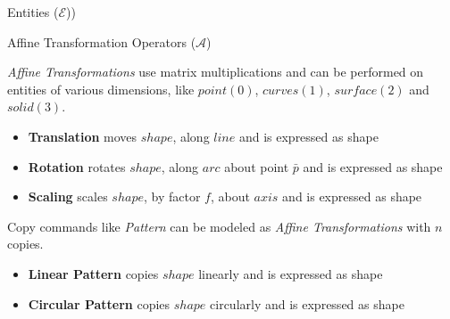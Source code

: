 \begin{frame}{Entities ($\mathcal{E}$))}
\begin{itemize}[noitemsep,label=\textbullet,topsep=2pt,parsep=2pt,partopsep=2pt]
%

%

\end{itemize}
\end{frame}
\begin{frame}{Affine Transformation Operators ($\mathcal{A}$)}

{\em Affine Transformations} use matrix multiplications and can be performed on entities of various dimensions, like $point (0)$, $curves(1)$, $surface(2)$ and $solid(3)$. 

\begin{itemize}[noitemsep,label=\textbullet,topsep=2pt,parsep=2pt,partopsep=2pt]
\item {\bf Translation} moves $shape$, along $line$ and is expressed as 	 {shape}
\item{\bf Rotation} rotates $shape$, along $arc$ about point $\bar{p}$ and is expressed as 	 {shape}	
\item {\bf Scaling} scales $shape$, by factor  $f$, about $axis$ and is expressed as 	 {shape}	
\end{itemize}

Copy commands like {\em Pattern} can be modeled as {\em Affine Transformations} with $n$ copies.

\begin{itemize}[noitemsep,label=\textbullet,topsep=2pt,parsep=2pt,partopsep=2pt]%
\item {\bf Linear Pattern} copies $shape$ linearly and is expressed as  {shape} 
\item {\bf Circular Pattern} copies $shape$ circularly and is expressed as  {shape} 
\end{itemize}

\end{frame}

